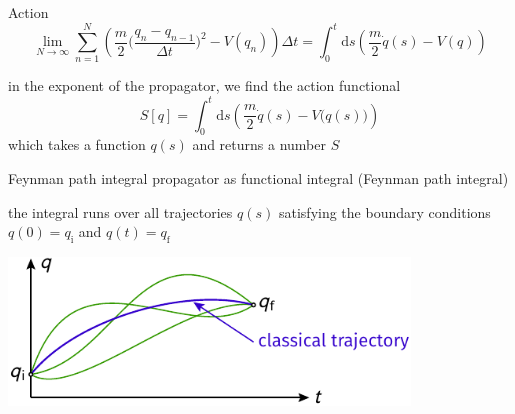 \documentclass[t,dvipsnames]{beamer}
\begin{document}
\begin{frame}[c]{Action}
 \begin{displaymath}
  \lim_{N\to\infty}\sum_{n=1}^N\left(\frac{m}{2}\bigg(\frac{q_n-q_{n-1}}{\Delta t}\bigg)^2
                                     -V(q_n)\right)\Delta t
	= \int_0^t\text{d}s\left(\frac{m}{2}\dot q(s)-V(q)\right)
 \end{displaymath}

 in the exponent of the propagator, we find the action functional
 \begin{displaymath}
  S[q] = \int_0^t\text{d}s\left(\frac{m}{2}\dot q(s)-V\big(q(s)\big)\right)
 \end{displaymath}
 which takes a function $q(s)$ and returns a number $S$

 \begin{center}
 \end{center}
\end{frame}

\begin{frame}[c]{Feynman path integral}
 propagator as functional integral (Feynman path integral)

 \begin{center}
 \end{center}

 \vspace{0.5truecm}
 the integral runs over all trajectories $q(s)$ satisfying the boundary
 conditions $q(0)=q_\text{i}$ and $q(t)=q_\text{f}$

 \begin{center}
  \includegraphics[width=0.8\textwidth]{feynman}
 \end{center}
\end{frame}
\end{document}
